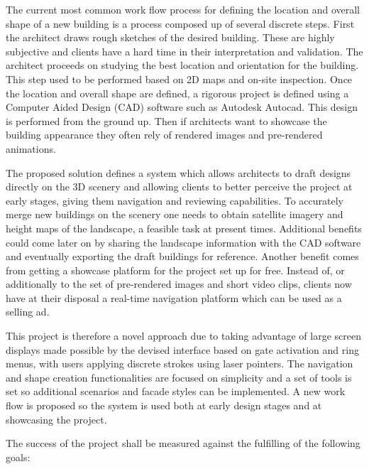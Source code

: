 
The current most common work flow process for defining the location and overall shape
of a new building is a process composed up of several discrete steps.
First the architect draws rough sketches of the desired building.
These are highly subjective and clients have a hard time in their interpretation and validation.
The architect proceeds on studying the best location and orientation for the building.
This step used to be performed based on 2D maps and on-site inspection.
Once the location and overall shape are defined, a rigorous project is defined using
a Computer Aided Design (CAD) software such as Autodesk Autocad\cite{SITE-AUTOCAD}.
This design is performed from the ground up.
Then if architects want to showcase the building appearance they often rely of rendered images
and pre-rendered animations.



The proposed solution defines a system which allows architects to draft designs
directly on the 3D scenery and allowing clients to better perceive the project at early stages,
giving them navigation and reviewing capabilities.
To accurately merge new buildings on the scenery one needs to obtain
satellite imagery and height maps of the landscape, a feasible task at present times.
Additional benefits could come later on by sharing the landscape information with the CAD
software and eventually exporting the draft buildings for reference.
Another benefit comes from getting a showcase platform for the project set up for free.
Instead of, or additionally to the set of pre-rendered images and short video clips,
clients now have at their disposal a real-time navigation platform which can be used
as a selling ad.



This project is therefore a novel approach due to taking advantage of large screen displays
made possible by the devised interface based on gate activation and ring menus,
with users applying discrete strokes using laser pointers.
The navigation and shape creation functionalities are focused on simplicity and a set
of tools is set so additional scenarios and facade styles can be implemented.
A new work flow is proposed so the system is used both at early design stages and
at showcasing the project.

The success of the project shall be measured against the fulfilling of the following goals:


